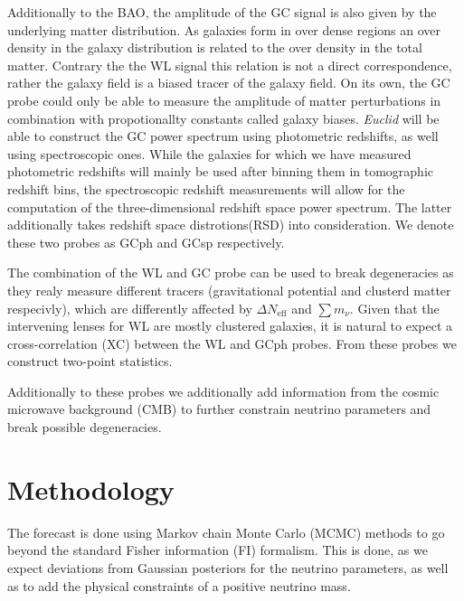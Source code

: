 \documentclass[a4paper,11pt]{article}
\newcommand{\euclid}{\textit{Euclid}\xspace}
\newcommand{\dneff}{\Delta N_\mathrm{eff}}
\newcommand{\summnu}{\sum m_\nu}
\begin{document}
Additionally to the BAO, the amplitude of the GC signal is also given by the underlying matter distribution. As galaxies form in over dense regions an over density in the galaxy     distribution is related to the over density in the total matter. Contrary the the WL signal this relation is not a direct correspondence, rather the galaxy field is a biased tracer of the galaxy field. On its own, the GC probe could only be able to measure the amplitude of matter perturbations in combination with propotionallty constants called galaxy biases. \euclid will be able to construct the GC power spectrum using photometric redshifts, as well using spectroscopic ones. While the galaxies for which we have measured photometric redshifts will mainly be used after binning them in tomographic redshift bins, the spectroscopic redshift measurements will allow for the computation of the three-dimensional redshift space power spectrum. The latter additionally takes redshift space distrotions(RSD) into consideration. We denote these two probes as GCph and GCsp respectively.

The combination of the WL and GC probe can be used to break degeneracies as they realy measure different tracers (gravitational potential and clusterd matter respecivly), which are differently affected by $\dneff$ and $\summnu$. Given that the intervening lenses for WL are mostly clustered galaxies, it is natural to expect a cross-correlation (XC) between the WL and GCph probes. From these probes we construct two-point statistics.

Additionally to these probes we additionally add information from the cosmic microwave background (CMB) to further constrain neutrino parameters and break possible degeneracies.

\section{Methodology}

The forecast is done using Markov chain Monte Carlo (MCMC) methods to go beyond the standard Fisher information (FI) formalism. This is done, as we expect deviations from Gaussian posteriors for the neutrino parameters, as well as to add the physical constraints of a positive neutrino mass.
\end{document}
